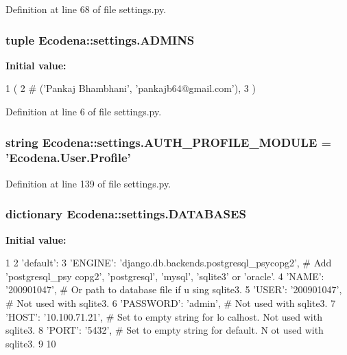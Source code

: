 Definition at line 68 of file settings.py.

\hypertarget{namespace_ecodena_1_1settings_aa5eefb4c0b5c39c9094d35a2878057b5}{
\subsubsection[{ADMINS}]{\setlength{\rightskip}{0pt plus 5cm}tuple {\bf Ecodena::settings.ADMINS}}}
\label{d1/d62/namespace_ecodena_1_1settings_aa5eefb4c0b5c39c9094d35a2878057b5}
{\bfseries Initial value:}
\begin{DoxyCode}
1 (
2     # ('Pankaj Bhambhani', 'pankajb64@gmail.com'),
3 )
\end{DoxyCode}


Definition at line 6 of file settings.py.

\hypertarget{namespace_ecodena_1_1settings_a7ffd079a2ae998fcd397ee29a253cea4}{
\subsubsection[{AUTH\_\-PROFILE\_\-MODULE}]{\setlength{\rightskip}{0pt plus 5cm}string {\bf Ecodena::settings.AUTH\_\-PROFILE\_\-MODULE} = 'Ecodena.User.Profile'}}
\label{d1/d62/namespace_ecodena_1_1settings_a7ffd079a2ae998fcd397ee29a253cea4}


Definition at line 139 of file settings.py.

\hypertarget{namespace_ecodena_1_1settings_afb77b339554c377a23190143df82d805}{
\subsubsection[{DATABASES}]{\setlength{\rightskip}{0pt plus 5cm}dictionary {\bf Ecodena::settings.DATABASES}}}
\label{d1/d62/namespace_ecodena_1_1settings_afb77b339554c377a23190143df82d805}
{\bfseries Initial value:}
\begin{DoxyCode}
1 {
2     'default': {
3         'ENGINE': 'django.db.backends.postgresql_psycopg2', # Add 'postgresql_psy
      copg2', 'postgresql', 'mysql', 'sqlite3' or 'oracle'.
4         'NAME': '200901047',                      # Or path to database file if u
      sing sqlite3.
5         'USER': '200901047',                      # Not used with sqlite3.
6         'PASSWORD': 'admin',                  # Not used with sqlite3.
7         'HOST': '10.100.71.21',                      # Set to empty string for lo
      calhost. Not used with sqlite3.
8         'PORT': '5432',                      # Set to empty string for default. N
      ot used with sqlite3.
9     }
10 }
\end{DoxyCode}


